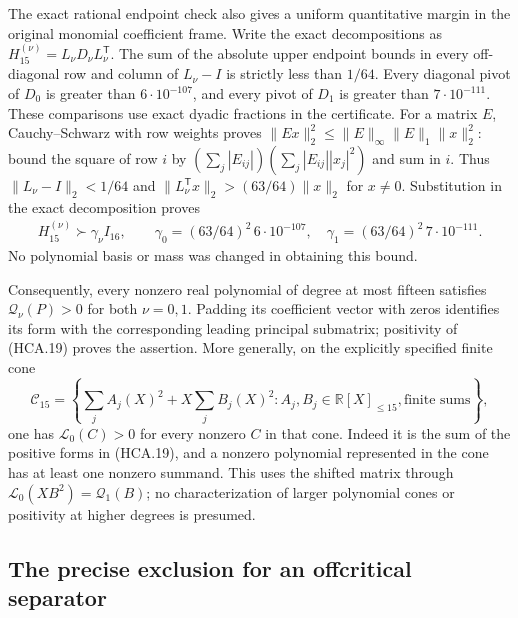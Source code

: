 The exact rational endpoint check also gives a uniform quantitative
margin in the original monomial coefficient frame. Write the exact
decompositions as $H_{15}^{(\nu)}=L_\nu D_\nu L_\nu^{\mathsf T}$.
The sum of the absolute upper endpoint bounds in every off-diagonal
row and column of $L_\nu-I$ is strictly less than $1/64$.
Every diagonal pivot of $D_0$ is greater than $6\cdot10^{-107}$,
and every pivot of $D_1$ is greater than $7\cdot10^{-111}$.
These comparisons use exact dyadic fractions in the certificate.
For a matrix $E$, Cauchy--Schwarz with row weights proves
$\|Ex\|_2^2\leq\|E\|_\infty\|E\|_1\|x\|_2^2$:
bound the square of row $i$ by
$(\sum_j|E_{ij}|)(\sum_j|E_{ij}||x_j|^2)$ and sum in $i$.
Thus $\|L_\nu-I\|_2<1/64$ and
$\|L_\nu^{\mathsf T}x\|_2>(63/64)\|x\|_2$ for $x\ne0$.
Substitution in the exact decomposition proves
\[
 \begin{gathered}
 H_{15}^{(\nu)}\succ\gamma_\nu I_{16},\qquad
 \gamma_0=(63/64)^2\,6\cdot10^{-107},\quad
 \gamma_1=(63/64)^2\,7\cdot10^{-111}.
 \end{gathered}
 \tag{HCA.19a}
\]
No polynomial basis or mass was changed in obtaining this bound.

Consequently, every nonzero real polynomial of degree at most
fifteen satisfies $\mathcal Q_\nu(P)>0$ for both $\nu=0,1$.
Padding its coefficient vector with zeros identifies its form
with the corresponding leading principal submatrix; positivity
of (HCA.19) proves the assertion. More generally, on the explicitly
specified finite cone
\[
 \mathscr C_{15}=\left\{\sum_j A_j(X)^2+X\sum_j B_j(X)^2:
          A_j,B_j\in\mathbb R[X]_{\leq15},
          \text{finite sums}\right\},
 \tag{HCA.20}
\]
one has $\mathcal L_0(C)>0$ for every nonzero $C$ in that cone.
Indeed it is the sum of the positive forms in (HCA.19), and a
nonzero polynomial represented in the cone has at least one
nonzero summand. This uses the shifted matrix through
$\mathcal L_0(XB^2)=\mathcal Q_1(B)$; no characterization of
larger polynomial cones or positivity at higher degrees is presumed.

\subsection{The precise exclusion for an offcritical separator}

